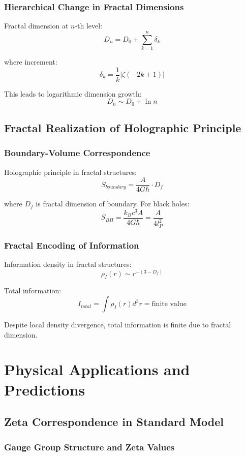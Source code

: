 \documentclass[11pt]{article}
\begin{document}
\subsubsection{Hierarchical Change in Fractal Dimensions}

Fractal dimension at $n$-th level:
$$D_n = D_0 + \sum_{k=1}^n \delta_k$$

where increment:
$$\delta_k = \frac{1}{k} \left|\zeta(-2k+1)\right|$$

This leads to logarithmic dimension growth:
$$D_n \sim D_0 + \ln n$$

\subsection{Fractal Realization of Holographic Principle}

\subsubsection{Boundary-Volume Correspondence}

Holographic principle in fractal structures:
$$S_{boundary} = \frac{A}{4G\hbar} \cdot D_f$$

where $D_f$ is fractal dimension of boundary. For black holes:
$$S_{BH} = \frac{k_B c^3 A}{4G\hbar} = \frac{A}{4l_P^2}$$

\subsubsection{Fractal Encoding of Information}

Information density in fractal structures:
$$\rho_I(r) \sim r^{-(3-D_f)}$$

Total information:
$$I_{total} = \int \rho_I(r) d^3r = \text{finite value}$$

Despite local density divergence, total information is finite due to fractal dimension.

\section{Physical Applications and Predictions}

\subsection{Zeta Correspondence in Standard Model}

\subsubsection{Gauge Group Structure and Zeta Values}
\end{document}
